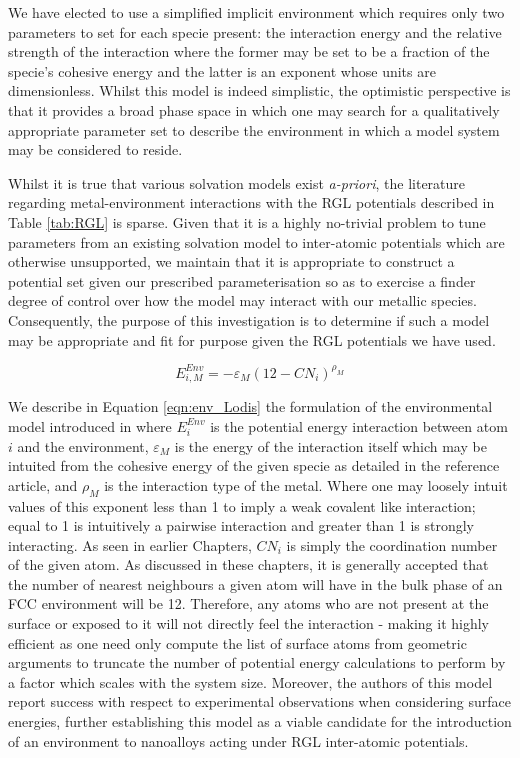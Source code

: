 We have elected to use a simplified implicit environment which requires only two parameters to set for each specie present: the interaction energy and the relative strength of the interaction where the former may be set to be a fraction of the specie's cohesive energy and the latter is an exponent whose units are dimensionless. Whilst this model is indeed simplistic, the optimistic perspective is that it provides a broad phase space in which one may search for a qualitatively appropriate parameter set to describe the environment in which a model system may be considered to reside.

Whilst it is true that various solvation models exist \textit{a-priori}, the literature regarding metal-environment interactions with the RGL potentials described in Table \ref{tab:RGL} is sparse. Given that it is a highly no-trivial problem to tune parameters from an existing solvation model to inter-atomic potentials which are otherwise unsupported, we maintain that it is appropriate to construct a potential set given our prescribed parameterisation so as to exercise a finder degree of control over how the model may interact with our metallic species. Consequently, the purpose of this investigation is to determine if such a model may be appropriate and fit for purpose given the RGL potentials we have used.

\begin{equation}
    E_{i,M}^{Env} = -\varepsilon_{M} \left( 12 -  CN_{i} \right) ^{\rho_{M}}
    \label{eqn:env_Lodis}
\end{equation}

We describe in Equation \ref{eqn:env_Lodis} the formulation of the environmental model introduced in \cite{doi:10.1063/1.4811670} where $E_{i}^{Env}$ is the potential energy interaction between atom $i$ and the environment, $\varepsilon_{M}$ is the energy of the interaction itself which may be intuited from the cohesive energy of the given specie as detailed in the reference article, and $\rho_{M}$ is the interaction type of the metal. Where one may loosely intuit values of this exponent less than 1 to imply a weak covalent like interaction; equal to 1 is intuitively a pairwise interaction and greater than 1 is strongly interacting. As seen in earlier Chapters, $CN_{i}$ is simply the coordination number of the given atom. As discussed in these chapters, it is generally accepted that the number of nearest neighbours a given atom will have in the bulk phase of an FCC environment will be 12. Therefore, any atoms who are not present at the surface or exposed to it will not directly feel the interaction - making it highly efficient as one need only compute the list of surface atoms from geometric arguments to truncate the number of potential energy calculations to perform by a factor which scales with the system size. Moreover, the authors of this model report success with respect to experimental observations when considering surface energies, further establishing this model as a viable candidate for the introduction of an environment to nanoalloys acting under RGL inter-atomic potentials.

